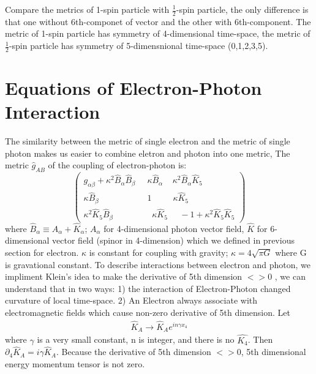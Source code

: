 \documentclass[twocolumn,showpacs,preprintnumbers,amsmath,amssymb]{revtex4}
\begin{document}
Compare the metrics of 1-spin particle with $\frac{1}{2}$-spin particle, 
the only difference is that one without 6th-componet 
of vector and the other with 6th-component. The metric of 1-spin particle has symmetry of 
4-dimensional time-space, the metric
of $\frac{1}{2}$-spin particle has symmetry of 5-dimensnional time-space (0,1,2,3,5).

\section{Equations of Electron-Photon Interaction} \label{Interaction}

The similarity between the metric of single electron and the metric of single photon 
makes us easier to combine eletron and photon into one metric, The metric $\hat{g}_{AB}$ of the coupling of
electron-photon is:
\begin{equation}
\left( \begin{array}{cc}
   g_{\alpha\beta} + \kappa^{2} \hat{B}_{\alpha} \hat{B}_{\beta} \; & \; 
    \kappa \hat{B}_{\alpha} \; \; \; \; \kappa^{2}\hat{B}_{\alpha} \hat{K}_{5}  \\
    \kappa \hat{B}_{\beta}  \; & \; 
     1 \; \; \; \; \;  \;  \; \;  \;  \kappa \hat{K}_5 \\
   \kappa^{2} \hat{K}_{5} \hat{B}_{\beta} \; & \; \; \; \kappa \hat{K}_5  \; \; \; \;  \;  -1+ \kappa^{2} \hat{K}_{5} \hat{K}_{5}  \end{array} \right) 
\label{6dMetricCoupl_e}
\end{equation}
where $\hat{B}_\alpha \equiv A_{\alpha}+\hat{K}_{\alpha} $;  $A_{\alpha}$ for 4-dimensional photon vector field, $\hat{K}$ for 
6-dimensional vector field (spinor in 4-dimension) which we defined in previous section for electron. 
$\kappa$ is constant for coupling with gravity; $\kappa = 4\sqrt{\pi G}$ where G is gravational constant.
To describe interactions between electron and photon, we impliment Klein's idea \cite{Kle26a} to make the 
derivative of 5th dimension $<>0$ , we can understand that in two ways: 1)
the interaction of Electron-Photon changed curvature of local time-space. 2) An Electron always associate with electromagnetic fields 
which cause non-zero derivative of 5th dimension.
Let
\begin{eqnarray}
\hat{K}_{A} \rightarrow \hat{K}_{A}e^{in\gamma x_4}   
\label{4thDeriv}
\end{eqnarray}
where $\gamma $ is a very small constant, n is integer, and there is no $\hat{K_4}$. Then $\partial_4 \hat{K}_{A} = i \gamma \hat{K}_{A} $.
Because the derivative of 5th dimension $<> 0$, 5th dimensional energy momentum tensor is not zero.
\end{document}
